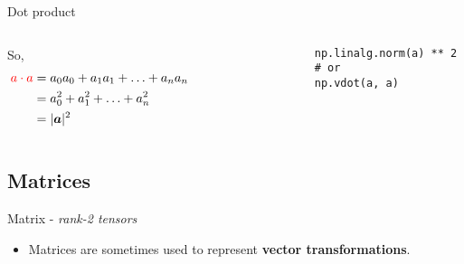 \documentclass[handout]{beamer}
\begin{document}
\begin{frame}[fragile]{Dot product}
    \begin{columns}
        \begin{column}{0.5\textwidth}
            So,
            \begin{align*}
                \textcolor{red}{a \cdot a} &= a_0a_0 + a_1a_1 + \ldots + a_na_n \\
                                           &= a_0^2  + a_1^2  + \ldots + a_n^2 \\
                                           &= |\boldsymbol{a}|^2
            \end{align*}
        \end{column}
        \begin{column}{0.5\textwidth}
            \begin{alertblock}{}
                \begin{lstlisting}
                np.linalg.norm(a) ** 2
                # or 
                np.vdot(a, a)
                \end{lstlisting}
            \end{alertblock}
        \end{column}
    \end{columns}
\end{frame}


\subsection{Matrices}
\begin{frame}[fragile]{Matrix - \textit{rank-2 tensors}}
    \begin{itemize}
        \item Matrices are sometimes used to represent \textbf{vector transformations}.
    \end{itemize}
\end{frame}
\end{document}
